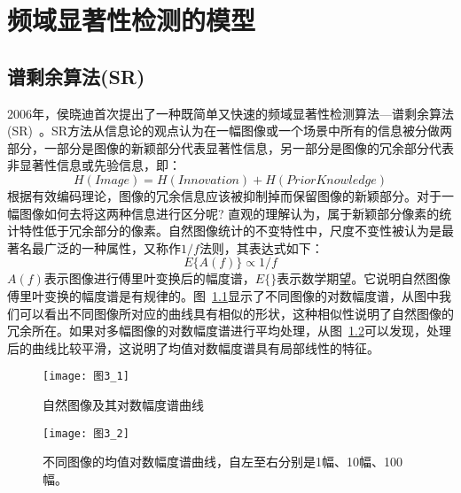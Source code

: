 \chapter{频域显著性检测的模型}
\label{cha3}

\section{谱剩余算法(SR)}
\label{3_1}

2006年，侯晓迪首次提出了一种既简单又快速的频域显著性检测算法---谱剩余算法(SR)~\cite{HouXiaodiCVPR2007Residual}。SR方法从信息论\cite{Barlow1961Possible}的观点认为在一幅图像或一个场景中所有的信息被分做两部分，一部分是图像的新颖部分代表显著性信息，另一部分是图像的冗余部分代表非显著性信息或先验信息，即：
\begin{equation}
H(Image)=H(Innovation)+H(Prior Knowledge)
\label{式3_1}
\end{equation}
根据有效编码理论，图像的冗余信息应该被抑制掉而保留图像的新颖部分。对于一幅图像如何去将这两种信息进行区分呢? 直观的理解认为，属于新颖部分像素的统计特性低于冗余部分的像素。自然图像统计的不变特性中，尺度不变性\cite{Ruderman1994Statistics,Srivastava2003Advances}被认为是最著名最广泛的一种属性，又称作$1/f$法则，其表达式如下：
\begin{equation}
E\{A(f)\}\propto 1/f
\label{式3_2}
\end{equation}
$A(f)$表示图像进行傅里叶变换后的幅度谱，$E\{\}$表示数学期望。它说明自然图像傅里叶变换的幅度谱是有规律的。图~\ref{图3_1}显示了不同图像的对数幅度谱，从图中我们可以看出不同图像所对应的曲线具有相似的形状，这种相似性说明了自然图像的冗余所在。如果对多幅图像的对数幅度谱进行平均处理，从图~\ref{图3_2}可以发现，处理后的曲线比较平滑，这说明了均值对数幅度谱具有局部线性的特征\cite{HouXiaodiCVPR2007Residual}。
\begin{figure}[!t] %
\centering
\texttt{[image: 图3\_1]}
\caption{自然图像及其对数幅度谱曲线}
\label{图3_1}
\end{figure}
\begin{figure}[!t] %
\centering
\texttt{[image: 图3\_2]}
\caption{不同图像的均值对数幅度谱曲线，自左至右分别是1幅、10幅、100幅。}
\label{图3_2}
\end{figure}

